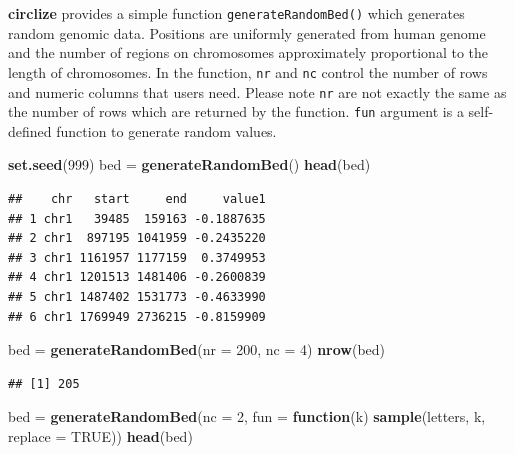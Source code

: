 \documentclass[]{book}
\newenvironment{Shaded}{\begin{snugshade}}{\end{snugshade}}
\newcommand{\KeywordTok}[1]{\textcolor[rgb]{0.13,0.29,0.53}{\textbf{#1}}}
\newcommand{\DataTypeTok}[1]{\textcolor[rgb]{0.13,0.29,0.53}{#1}}
\newcommand{\DecValTok}[1]{\textcolor[rgb]{0.00,0.00,0.81}{#1}}
\newcommand{\StringTok}[1]{\textcolor[rgb]{0.31,0.60,0.02}{#1}}
\newcommand{\OtherTok}[1]{\textcolor[rgb]{0.56,0.35,0.01}{#1}}
\newcommand{\ControlFlowTok}[1]{\textcolor[rgb]{0.13,0.29,0.53}{\textbf{#1}}}
\newcommand{\NormalTok}[1]{#1}
\begin{document}
\textbf{circlize} provides a simple function
\texttt{generateRandomBed()} which generates random genomic data.
Positions are uniformly generated from human genome and the number of
regions on chromosomes approximately proportional to the length of
chromosomes. In the function, \texttt{nr} and \texttt{nc} control the
number of rows and numeric columns that users need. Please note
\texttt{nr} are not exactly the same as the number of rows which are
returned by the function. \texttt{fun} argument is a self-defined
function to generate random values.

\begin{Shaded}
\begin{Highlighting}[]
\KeywordTok{set.seed}\NormalTok{(}\DecValTok{999}\NormalTok{)}
\NormalTok{bed =}\StringTok{ }\KeywordTok{generateRandomBed}\NormalTok{()}
\KeywordTok{head}\NormalTok{(bed)}
\end{Highlighting}
\end{Shaded}

\begin{verbatim}
##    chr   start     end     value1
## 1 chr1   39485  159163 -0.1887635
## 2 chr1  897195 1041959 -0.2435220
## 3 chr1 1161957 1177159  0.3749953
## 4 chr1 1201513 1481406 -0.2600839
## 5 chr1 1487402 1531773 -0.4633990
## 6 chr1 1769949 2736215 -0.8159909
\end{verbatim}

\begin{Shaded}
\begin{Highlighting}[]
\NormalTok{bed =}\StringTok{ }\KeywordTok{generateRandomBed}\NormalTok{(}\DataTypeTok{nr =} \DecValTok{200}\NormalTok{, }\DataTypeTok{nc =} \DecValTok{4}\NormalTok{)}
\KeywordTok{nrow}\NormalTok{(bed)}
\end{Highlighting}
\end{Shaded}

\begin{verbatim}
## [1] 205
\end{verbatim}

\begin{Shaded}
\begin{Highlighting}[]
\NormalTok{bed =}\StringTok{ }\KeywordTok{generateRandomBed}\NormalTok{(}\DataTypeTok{nc =} \DecValTok{2}\NormalTok{, }\DataTypeTok{fun =} \ControlFlowTok{function}\NormalTok{(k) }\KeywordTok{sample}\NormalTok{(letters, k, }\DataTypeTok{replace =} \OtherTok{TRUE}\NormalTok{))}
\KeywordTok{head}\NormalTok{(bed)}
\end{Highlighting}
\end{Shaded}
\end{document}

